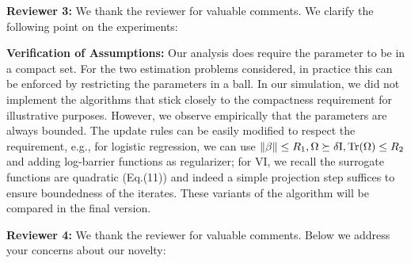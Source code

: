 \documentclass{article}
\begin{document}
\textbf{\textcolor{yellow!50!black}{Reviewer 3:}} We thank the reviewer for valuable comments. We clarify the following point on the experiments:\vspace{-5pt}

\textbf{Verification of Assumptions:} Our analysis does require the parameter to be in a compact set.
For the two estimation problems considered, in practice this can be enforced by restricting the parameters in a ball. 
In our simulation, we did not implement the algorithms that stick closely to the compactness requirement for illustrative purposes. However, we observe empirically that the parameters are always bounded.
The update rules can be easily modified to respect the requirement, e.g., for logistic regression, we can use $\|\beta\| \leq R_1, \Omega \succeq \delta {\rm I}, {\rm Tr}(\Omega) \leq R_2$ and adding log-barrier functions as regularizer; for VI, we recall the surrogate functions are quadratic (Eq.(11)) and indeed a simple projection step suffices to ensure boundedness of the iterates.
These variants of the algorithm will be compared in the final version.








\textbf{\textcolor{green!50!black}{Reviewer 4:}} We thank the reviewer for valuable comments. Below we address your concerns about our novelty:\vspace{-5pt}
\end{document}
